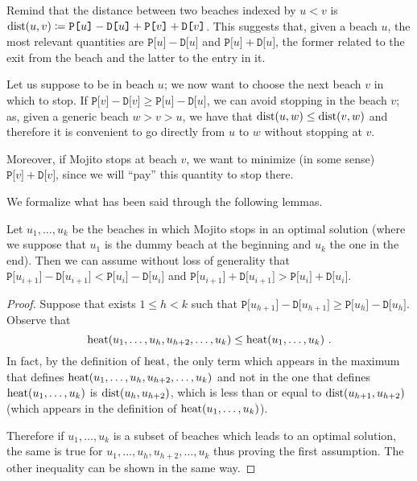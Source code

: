 \Lineare

Remind that the distance between two beaches indexed by $u<v$ is $\mathrm{dist}(u,v) \coloneqq \texttt{P[}u \texttt{]} - \texttt{D[}u\texttt{]} + \texttt{P[}v\texttt{]}+\texttt{D[}v\texttt{]}$.
This suggests that, given a beach $u$, the most relevant quantities are $\texttt{P[}u \texttt{]} - \texttt{D[}u\texttt{]}$ and $\texttt{P[}u \texttt{]} + \texttt{D[}u\texttt{]}$, the former related to the exit from the beach and the latter to the entry in it.

Let us suppose to be in beach $u$; we now want to choose the next beach $v$ in which to stop. If $\texttt{P[}v \texttt{]} - \texttt{D[}v\texttt{]} \ge \texttt{P[}u \texttt{]} - \texttt{D[}u\texttt{]}$, we can avoid stopping in the beach $v$; as, given a generic beach $w > v>u$, we have that $\mathrm{dist}(u,w) \le \mathrm{dist}(v,w)$ and therefore it is convenient to go directly from $u$ to $w$ without stopping at $v$.

Moreover, if Mojito stops at beach $v$, we want to minimize (in some sense) $\texttt{P[}v \texttt{]} + \texttt{D[}v\texttt{]}$, since we will ``pay'' this quantity to stop there.

We formalize what has been said through the following lemmas.

\begin{lemma}
	Let $u_1,\ldots,u_k$ be the beaches in which Mojito stops in an optimal solution (where we suppose that $u_1$ is the dummy beach at the beginning and $u_k$ the one in the end). Then we can assume without loss of generality that $\texttt{P[}u_{i+1} \texttt{]} - \texttt{D[}u_{i+1}\texttt{]} < \texttt{P[}u_i \texttt{]} - \texttt{D[}u_i\texttt{]}$ and $\texttt{P[}u_{i+1} \texttt{]} + \texttt{D[}u_{i+1}\texttt{]} > \texttt{P[}u_i \texttt{]} + \texttt{D[}u_i\texttt{]}$.
\end{lemma}
\begin{small}
\begin{proof}
	Suppose that exists $1\le h < k$ such that $\texttt{P[}u_{h+1} \texttt{]} - \texttt{D[}u_{h+1}\texttt{]} \ge \texttt{P[}u_h \texttt{]} - \texttt{D[}u_h\texttt{]}$. Observe that 
	\begin{equation*}
		\mathrm{heat}(u_1,\ldots, u_h, u_{h+2}, \ldots, u_k) \le \mathrm{heat}(u_1, \ldots, u_k) \ .
	\end{equation*}
	In fact, by the definition of $\mathrm{heat}$, the only term which appears in the maximum that defines $\mathrm{heat}(u_1,\ldots, u_h, u_{h+2}, \ldots, u_k)$ and not in the one that defines $\mathrm{heat}(u_1, \ldots, u_k)$ is $\mathrm{dist}(u_h, u_{h+2})$, which is less than or equal to $\mathrm{dist}(u_{h+1},u_{h+2})$ (which appears in the definition of $\mathrm{heat}(u_1, \ldots, u_k)$).
	
	Therefore if $u_1,\ldots,u_k$ is a subset of beaches which leads to an optimal solution, the same is true for $u_1,\ldots,u_h,u_{h+2},\ldots, u_k$ thus proving the first assumption. The other inequality can be shown in the same way.
\end{proof}
\end{small}

